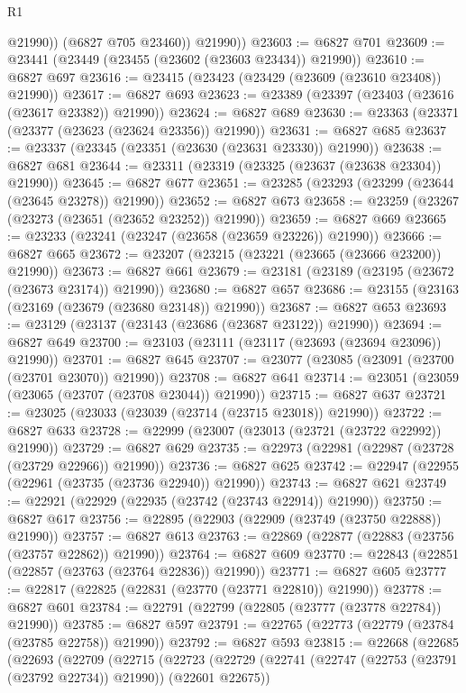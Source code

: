 \begin{lexlean}{R1}
\begin{coremodule}
              @21990))
          (@6827 @705 @23460))
        @21990))
@23603 := @6827 @701
@23609 := @23441 (@23449 (@23455 (@23602 (@23603 @23434)) @21990))
@23610 := @6827 @697
@23616 := @23415 (@23423 (@23429 (@23609 (@23610 @23408)) @21990))
@23617 := @6827 @693
@23623 := @23389 (@23397 (@23403 (@23616 (@23617 @23382)) @21990))
@23624 := @6827 @689
@23630 := @23363 (@23371 (@23377 (@23623 (@23624 @23356)) @21990))
@23631 := @6827 @685
@23637 := @23337 (@23345 (@23351 (@23630 (@23631 @23330)) @21990))
@23638 := @6827 @681
@23644 := @23311 (@23319 (@23325 (@23637 (@23638 @23304)) @21990))
@23645 := @6827 @677
@23651 := @23285 (@23293 (@23299 (@23644 (@23645 @23278)) @21990))
@23652 := @6827 @673
@23658 := @23259 (@23267 (@23273 (@23651 (@23652 @23252)) @21990))
@23659 := @6827 @669
@23665 := @23233 (@23241 (@23247 (@23658 (@23659 @23226)) @21990))
@23666 := @6827 @665
@23672 := @23207 (@23215 (@23221 (@23665 (@23666 @23200)) @21990))
@23673 := @6827 @661
@23679 := @23181 (@23189 (@23195 (@23672 (@23673 @23174)) @21990))
@23680 := @6827 @657
@23686 := @23155 (@23163 (@23169 (@23679 (@23680 @23148)) @21990))
@23687 := @6827 @653
@23693 := @23129 (@23137 (@23143 (@23686 (@23687 @23122)) @21990))
@23694 := @6827 @649
@23700 := @23103 (@23111 (@23117 (@23693 (@23694 @23096)) @21990))
@23701 := @6827 @645
@23707 := @23077 (@23085 (@23091 (@23700 (@23701 @23070)) @21990))
@23708 := @6827 @641
@23714 := @23051 (@23059 (@23065 (@23707 (@23708 @23044)) @21990))
@23715 := @6827 @637
@23721 := @23025 (@23033 (@23039 (@23714 (@23715 @23018)) @21990))
@23722 := @6827 @633
@23728 := @22999 (@23007 (@23013 (@23721 (@23722 @22992)) @21990))
@23729 := @6827 @629
@23735 := @22973 (@22981 (@22987 (@23728 (@23729 @22966)) @21990))
@23736 := @6827 @625
@23742 := @22947 (@22955 (@22961 (@23735 (@23736 @22940)) @21990))
@23743 := @6827 @621
@23749 := @22921 (@22929 (@22935 (@23742 (@23743 @22914)) @21990))
@23750 := @6827 @617
@23756 := @22895 (@22903 (@22909 (@23749 (@23750 @22888)) @21990))
@23757 := @6827 @613
@23763 := @22869 (@22877 (@22883 (@23756 (@23757 @22862)) @21990))
@23764 := @6827 @609
@23770 := @22843 (@22851 (@22857 (@23763 (@23764 @22836)) @21990))
@23771 := @6827 @605
@23777 := @22817 (@22825 (@22831 (@23770 (@23771 @22810)) @21990))
@23778 := @6827 @601
@23784 := @22791 (@22799 (@22805 (@23777 (@23778 @22784)) @21990))
@23785 := @6827 @597
@23791 := @22765 (@22773 (@22779 (@23784 (@23785 @22758)) @21990))
@23792 := @6827 @593
@23815 := @22668
    (@22685
      (@22693
        (@22709
          (@22715
            (@22723
              (@22729
                (@22741 (@22747 (@22753 (@23791 (@23792 @22734)) @21990)) (@22601 @22675))

\end{coremodule}
\end{lexlean}
